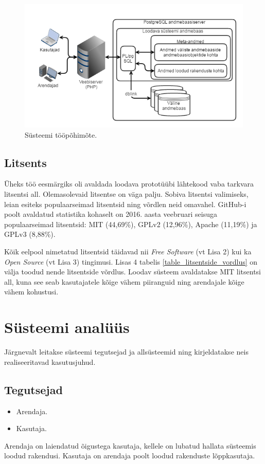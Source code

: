 \documentclass[a4paper,12pt]{article} %
\begin{document}
\begin{figure}[H]
\centering
\includegraphics[width=\textwidth]{./diagrams/how-should-pgapex-work.png}
\caption{Süsteemi tööpõhimõte.}
\label{fig_süsteemi_tööpõhimõte}
\end{figure}

\subsection{Litsents}
Üheks töö eesmärgiks oli avaldada loodava prototüübi lähtekood vaba tarkvara litsentsi all. Olemasolevaid litsentse on väga palju. Sobiva litsentsi valimiseks, leian esiteks populaarseimad litsentsid ning võrdlen neid omavahel.
GitHub-i poolt avaldatud statistika kohaselt on 2016. aasta veebruari seisuga populaarseimad litsentsid: MIT (44,69\%), GPLv2 (12,96\%), Apache (11,19\%) ja GPLv3 (8,88\%). \cite{GitHub_Opensource_Licence_Usage}\par
Kõik eelpool nimetatud litsentsid täidavad nii \textit{Free Software} (vt Lisa 2) kui ka \textit{Open Source} (vt Lisa 3) tingimusi. Lisas 4 tabelis \ref{table_litsentside_vordlus} on välja toodud nende litsentside võrdlus.
Loodav süsteem avaldatakse MIT litsentsi all, kuna see seab kasutajatele kõige vähem piiranguid ning arendajale kõige vähem kohustusi.

\section{Süsteemi analüüs}
\label{süsteemi_analüüs}
Järgnevalt leitakse süsteemi tegutsejad ja allsüsteemid ning kirjeldatakse neis realiseeritavad kasutusjuhud.
\subsection{Tegutsejad}
\begin{itemize}
\item Arendaja.
\item Kasutaja.
\end{itemize}
Arendaja on laiendatud õigustega kasutaja, kellele on lubatud hallata süsteemis loodud rakendusi. Kasutaja on arendaja poolt loodud rakenduste lõppkasutaja.
\end{document}

